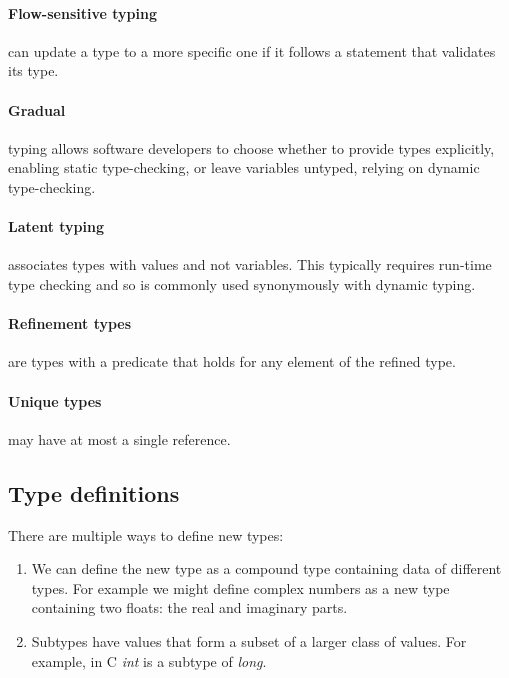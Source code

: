 \paragraph{Flow-sensitive typing} can update a type to a more specific one if it follows a statement that validates its type.
\paragraph{Gradual} typing allows software developers to choose whether to provide types explicitly, enabling static type-checking, or leave variables untyped, relying on dynamic type-checking.
\paragraph{Latent typing} associates types with values and not variables. This typically requires run-time type checking and so is commonly used synonymously with dynamic typing.
\paragraph{Refinement types} are types with a predicate that holds for any element of the refined type. 
\paragraph{Unique types} may have at most a single reference.



\subsection{Type definitions}
There are multiple ways to define new types:
\begin{enumerate}
\item We can define the new type as a compound type containing data of different types. For example we might define complex numbers as a new type containing two floats: the real and imaginary parts.
\item Subtypes have values that form a subset of a larger class of values. For example, in C \textit{int} is a subtype of \textit{long}.
\end{enumerate}

